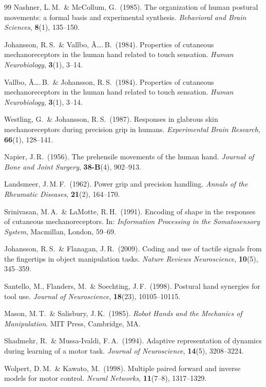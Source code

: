 ﻿\documentclass[12pt,a4paper]{report}
\theoremstyle{plain}
\theoremstyle{definition}
\theoremstyle{remark}
\begin{document}
\begin{thebibliography}{99}
Nashner, L.\,M.\ \& McCollum, G.\ (1985). The organization of human
postural movements: a formal basis and experimental synthesis.
\emph{Behavioral and Brain Sciences}, \textbf{8}(1), 135--150.

Johansson, R.\,S.\ \& Vallbo, Ã….\,B.\ (1984). Properties of cutaneous
mechanoreceptors in the human hand related to touch sensation.
\emph{Human Neurobiology}, \textbf{3}(1), 3--14.

Vallbo, Ã….\,B.\ \& Johansson, R.\,S.\ (1984). Properties of cutaneous
mechanoreceptors in the human hand related to touch sensation.
\emph{Human Neurobiology}, \textbf{3}(1), 3--14.

Westling, G.\ \& Johansson, R.\,S.\ (1987). Responses in glabrous skin
mechanoreceptors during precision grip in humans.
\emph{Experimental Brain Research}, \textbf{66}(1), 128--141.

Napier, J.\,R.\ (1956). The prehensile movements of the human hand.
\emph{Journal of Bone and Joint Surgery}, \textbf{38-B}(4), 902--913.

Landsmeer, J.\,M.\,F.\ (1962). Power grip and precision handling.
\emph{Annals of the Rheumatic Diseases}, \textbf{21}(2), 164--170.

Srinivasan, M.\,A.\ \& LaMotte, R.\,H.\ (1991). Encoding of shape in the
responses of cutaneous mechanoreceptors. In: \emph{Information Processing
in the Somatosensory System}, Macmillan, London, 59--69.

Johansson, R.\,S.\ \& Flanagan, J.\,R.\ (2009). Coding and use of tactile
signals from the fingertips in object manipulation tasks.
\emph{Nature Reviews Neuroscience}, \textbf{10}(5), 345--359.

Santello, M., Flanders, M.\ \& Soechting, J.\,F.\ (1998). Postural hand
synergies for tool use. \emph{Journal of Neuroscience}, \textbf{18}(23),
10105--10115.

Mason, M.\,T.\ \& Salisbury, J.\,K.\ (1985). \emph{Robot Hands and the
Mechanics of Manipulation}. MIT Press, Cambridge, MA.

Shadmehr, R.\ \& Mussa-Ivaldi, F.\,A.\ (1994). Adaptive representation of
dynamics during learning of a motor task. \emph{Journal of Neuroscience},
\textbf{14}(5), 3208--3224.

Wolpert, D.\,M.\ \& Kawato, M.\ (1998). Multiple paired forward and inverse
models for motor control. \emph{Neural Networks}, \textbf{11}(7--8),
1317--1329.


\end{thebibliography}
\end{document}
